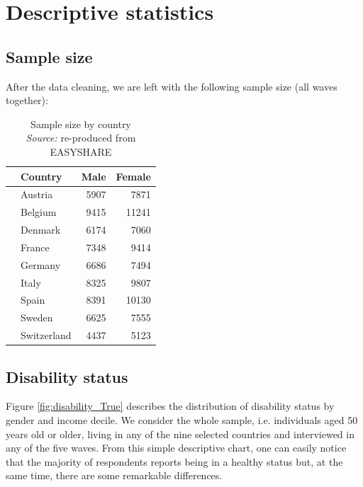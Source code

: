 




\section{Descriptive statistics}

\subsection{Sample size}
After the data cleaning, we are left with the following sample size (all waves together):

\begin{table}[H]
\begin{center}
\begin{tabular}{llrr}
\toprule
{} & \textbf{Country} &    \textbf{Male}    &  \textbf{Female}      \\
\midrule
 & Austria &   5907 &   7871 \\
        & Belgium &   9415 &  11241 \\
        & Denmark &   6174 &   7060 \\
        & France &   7348 &   9414 \\
        & Germany &   6686 &   7494 \\
        & Italy &   8325 &   9807 \\
        & Spain &   8391 &  10130 \\
        & Sweden &   6625 &   7555 \\
        & Switzerland &   4437 &   5123 \\
\bottomrule
\end{tabular}
\captionsetup{justification=centering}
\caption{Sample size by country \\ \textit{Source:} re-produced from EASYSHARE}
\end{center}
\end{table}

\subsection{Disability status}
Figure \ref{fig:disability_True} describes the distribution of disability status by gender and income decile. We consider the whole sample, i.e. individuals aged 50 years old or older, living in any of the nine selected countries and interviewed in any of the five waves. From this simple descriptive chart, one can easily notice that the majority of respondents reports being in a healthy status but, at the same time, there are some remarkable differences.\\




